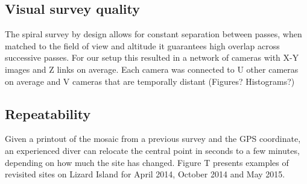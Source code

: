 \subsection{Visual survey quality}
The spiral survey by design allows for constant separation between passes, when matched to the field of view and altitude it guarantees high overlap across successive passes. For our setup this resulted in a network of cameras with X-Y images and Z links on average. Each camera was connected to U other cameras on average and V cameras that are temporally distant (Figures? Histograms?)

\subsection{Repeatability}
Given a printout of the mosaic from a previous survey and the GPS coordinate, an experienced diver can relocate the central point in seconds to a few minutes, depending on how much the site has changed.
Figure T presents examples of revisited sites on Lizard Island for April 2014, October 2014 and May 2015.


    
  
  